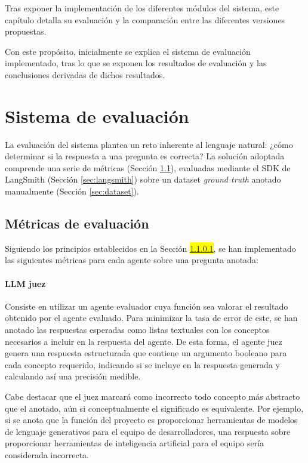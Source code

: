Tras exponer la implementación de los diferentes módulos del sistema, este capítulo detalla su evaluación y la comparación entre las diferentes versiones propuestas.

Con este propósito, inicialmente se explica el sistema de evaluación implementado, tras lo que se exponen los resultados de evaluación y las conclusiones derivadas de dichos resultados. 

\section{Sistema de evaluación}
La evaluación del sistema plantea un reto inherente al lenguaje natural: ¿cómo determinar si la respuesta a una pregunta es correcta? La solución adoptada comprende una serie de métricas (Sección \ref{sec:metricas}), evaluadas mediante el SDK de LangSmith (Sección \ref{sec:langsmith}) sobre un dataset \textit{ground truth} anotado manualmente (Sección \ref{sec:dataset}).

\subsection{Métricas de evaluación}

\label{sec:metricas}
Siguiendo los principios establecidos en la Sección \colorbox{yellow}{\ref{}}, se han implementado las siguientes métricas para cada agente sobre una pregunta anotada: 
\paragraph{LLM juez} Consiste en utilizar un agente evaluador cuya función sea valorar el resultado obtenido por el agente evaluado. Para minimizar la tasa de error de este, se han anotado las respuestas esperadas como listas textuales con los conceptos necesarios a incluir en la respuesta del agente. De esta forma, el agente juez genera una respuesta estructurada que contiene un argumento booleano para cada concepto requerido, indicando si se incluye en la respuesta generada y calculando así una precisión medible.

Cabe destacar que el juez marcará como incorrecto todo concepto más abstracto que el anotado, aún si conceptualmente el significado es equivalente. Por ejemplo, si se anota que la función del proyecto es proporcionar herramientas de modelos de lenguaje generativos para el equipo de desarrolladores, una respuesta sobre proporcionar herramientas de inteligencia artificial para el equipo sería considerada incorrecta.

